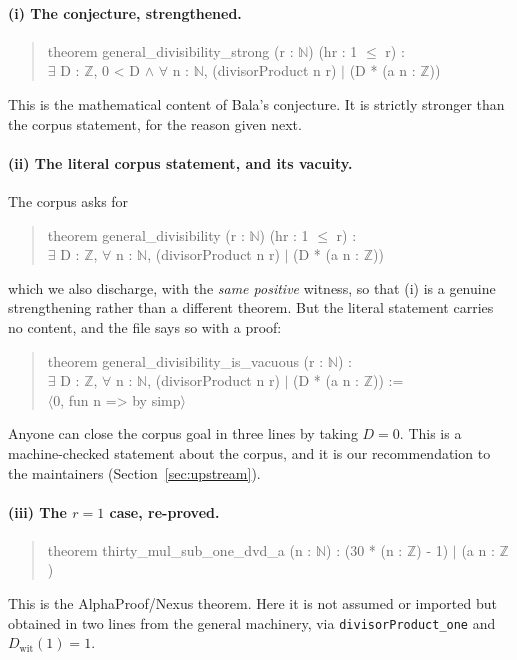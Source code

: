 \documentclass[11pt]{article}
\theoremstyle{plain}
\theoremstyle{definition}
\theoremstyle{remark}
\numberwithin{equation}{section}
\newcommand{\N}{\mathbb{N}}
\newcommand{\Z}{\mathbb{Z}}
\begin{document}
\paragraph{(i) The conjecture, strengthened.}
\begin{quote}\ttfamily\small
theorem general\_divisibility\_strong (r : $\N$) (hr : 1 $\le$ r) :\\
\hspace*{2em}$\exists$ D : $\Z$, 0 < D $\wedge$ $\forall$ n : $\N$, (divisorProduct n r) $\mid$ (D * (a n : $\Z$))
\end{quote}
This is the mathematical content of Bala's conjecture. It is strictly stronger than the corpus
statement, for the reason given next.

\paragraph{(ii) The literal corpus statement, and its vacuity.} The corpus asks for
\begin{quote}\ttfamily\small
theorem general\_divisibility (r : $\N$) (hr : 1 $\le$ r) :\\
\hspace*{2em}$\exists$ D : $\Z$, $\forall$ n : $\N$, (divisorProduct n r) $\mid$ (D * (a n : $\Z$))
\end{quote}
which we also discharge, with the \emph{same positive} witness, so that (i) is a genuine
strengthening rather than a different theorem. But the literal statement carries no content, and
the file says so with a proof:
\begin{quote}\ttfamily\small
theorem general\_divisibility\_is\_vacuous (r : $\N$) :\\
\hspace*{2em}$\exists$ D : $\Z$, $\forall$ n : $\N$, (divisorProduct n r) $\mid$ (D * (a n : $\Z$)) :=\\
\hspace*{2em}$\langle$0, fun n => by simp$\rangle$
\end{quote}
Anyone can close the corpus goal in three lines by taking $D=0$. This is a machine-checked
statement about the corpus, and it is our recommendation to the maintainers
(Section~\ref{sec:upstream}).

\paragraph{(iii) The $r=1$ case, re-proved.}
\begin{quote}\ttfamily\small
theorem thirty\_mul\_sub\_one\_dvd\_a (n : $\N$) : (30 * (n : $\Z$) - 1) $\mid$ (a n : $\Z$)
\end{quote}
This is the AlphaProof/Nexus theorem. Here it is not assumed or imported but obtained in two
lines from the general machinery, via \texttt{divisorProduct\_one} and $D_{\mathrm{wit}}(1) = 1$.
\end{document}
